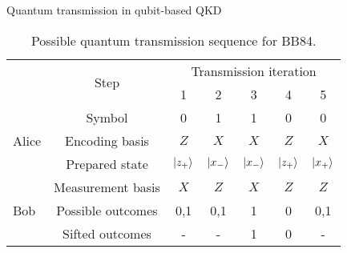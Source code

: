 \documentclass[aspectratio=169,usenames,dvipsnames]{beamer}
\begin{document}
	\begin{frame}{Quantum transmission in qubit-based QKD}
		\begin{table}
			\caption{Possible quantum transmission sequence for BB84.}
			\begin{tabular}{lcccccc}
				\toprule
				& \multirow{2}{*}{Step} & \multicolumn{5}{c}{Transmission iteration} \\
				\cmidrule(lr){3-7}
				& & 1 & 2 & 3 & 4 & 5 \\ 
				\midrule
				\multirow{3}{*}{Alice} & Symbol & \num{0} & \num{1} & \num{1} & \num{0} & \num{0} \\
				& Encoding basis & $Z$ & $X$ & $X$ & $Z$ & $X$ \\
				& Prepared state & $\lvert z_+\rangle$ & $\lvert x_-\rangle$ & $\lvert x_-\rangle$ & $\lvert z_+\rangle$ & $\lvert x_+\rangle$ \\
				\cmidrule{1-1}
				\multirow{3}{*}{Bob} & Measurement basis & $X$ & $Z$ & $X$ & $Z$ & $Z$ \\
				& Possible outcomes & \num{0},\num{1} & \num{0},\num{1} & \num{1} & \num{0} & \num{0},\num{1} \\
				& Sifted outcomes & - & - & \num{1} & \num{0} & - \\
				\bottomrule
			\end{tabular}
		\end{table}
	\end{frame}
	
\end{document}
